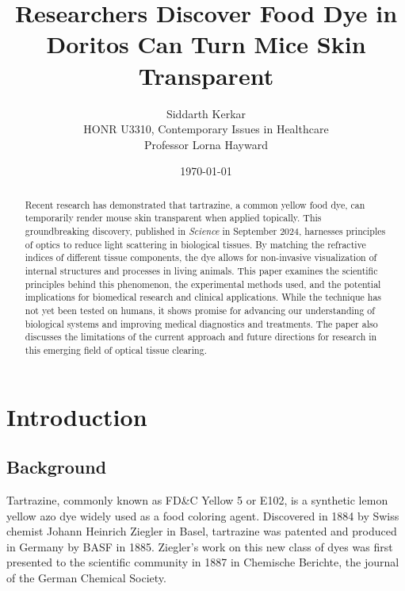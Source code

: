 \documentclass[12pt]{article}
\title{Researchers Discover Food Dye in Doritos Can Turn Mice Skin Transparent}
\author{Siddarth Kerkar \\ \small{HONR U3310, Contemporary Issues in Healthcare}\\ \small{Professor Lorna Hayward}}
\date{\today}  %
\begin{document}
\vfill  %

\maketitle

\vfill  %

\newpage

\begin{abstract}
  Recent research has demonstrated that tartrazine, a common yellow food dye, can temporarily render mouse skin transparent when applied topically. 
  This groundbreaking discovery, published in \emph{Science} in September 2024, harnesses principles of optics to reduce light scattering in biological tissues. 
  By matching the refractive indices of different tissue components, the dye allows for non-invasive visualization of internal structures and processes 
  in living animals. This paper examines the scientific principles behind this phenomenon, the experimental methods used, and the potential 
  implications for biomedical research and clinical applications. While the technique has not yet been tested on humans, it shows promise for advancing 
  our understanding of biological systems and improving medical diagnostics and treatments. The paper also discusses the limitations of the current 
  approach and future directions for research in this emerging field of optical tissue clearing.
\end{abstract}
\newpage

\tableofcontents
\newpage

\section{Introduction}
\label{sec:introduction} 

\subsection{Background}
Tartrazine, commonly known as FD\&C Yellow 5 or E102, is a synthetic lemon yellow azo dye widely used as a food coloring agent. Discovered in 1884 by Swiss chemist Johann Heinrich Ziegler in Basel, tartrazine was patented and produced in Germany by BASF in 1885. Ziegler's work on this new class of dyes was first presented to the scientific community in 1887 in Chemische Berichte, the journal of the German Chemical Society.
\end{document}
